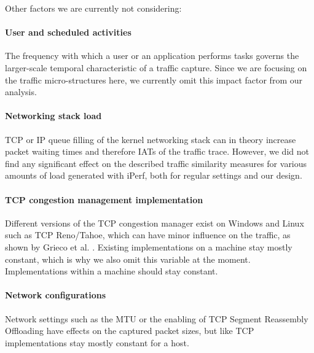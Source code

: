 \documentclass{article}
\begin{document}
\vspace{0.3cm}
Other factors we are currently not considering:

\paragraph{User and scheduled activities}
The frequency with which a user or an application performs tasks governs the larger-scale temporal characteristic of a traffic capture. Since we are focusing on the traffic micro-structures here, we currently omit this impact factor from our analysis. 

\paragraph{Networking stack load}
TCP or IP queue filling of the kernel networking stack can in theory increase packet waiting times and therefore IATs of the traffic trace. However, we did not find any significant effect on the described traffic similarity measures for various amounts of load generated with iPerf, both for regular settings and our design.



\paragraph{TCP congestion management implementation}
Different versions of the TCP congestion manager exist on Windows and Linux such as TCP Reno/Tahoe, which can have minor influence on the traffic, as shown by Grieco et al. \cite{grieco2004performance}. Existing implementations on a machine stay mostly constant, which is why we also omit this variable at the moment.
 Implementations within a machine should stay constant.

\paragraph{Network configurations}
Network settings such as the MTU or the enabling of TCP Segment Reassembly Offloading have effects on the captured packet sizes, but like TCP implementations stay mostly constant for a host. 
\end{document}
